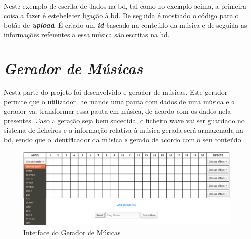 \documentclass[a4paper]{report}
\begin{document}
\paragraph{}Neste exemplo de escrita de dados na \ac{bd}, tal como no exemplo acima, a primeira coisa a fazer é estebelecer ligação à \ac{bd}. De seguida é mostrado o código para o botão de \textit{\textbf{upload}}. É criado um \textit{\textbf{id}} baseado na conteúdo da música e de seguida as informações referentes a essa música são escritas na \ac{bd}. 

\newpage

\section{\textit{Gerador de Músicas}}

\paragraph{}Nesta parte do projeto foi desenvolvido o gerador de músicas. Este gerador permite que o utilizador lhe mande uma pauta com dados de uma música e o gerador vai transformar essa pauta em música, de acordo com os dados nela presentes. Caso a geração seja bem sucedida, o ficheiro \ac{wave} vai ser guardado no sistema de ficheiros e a informação relativa à música gerada será armazenada na \ac{bd}, sendo que o identificador da música é gerado de acordo com o seu conteúdo.

\begin{figure}[H]
\center
\includegraphics [width=13cm] {imagens/interface_page3}
\caption{Interface do Gerador de Músicas}
\end{figure}
\end{document}
